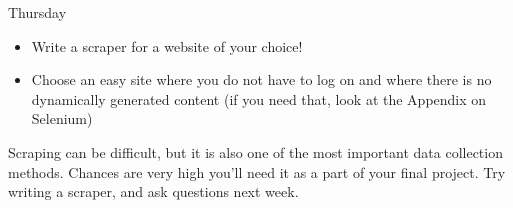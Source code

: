 \documentclass{beamer}
\begin{document}
%
%


\begin{frame}{Thursday}


\begin{itemize}
\item Write a scraper for a website of your choice!
\item Choose an easy site where you do not have to log on and where there is no dynamically generated content (if you need that, look at the Appendix on Selenium)
\end{itemize}

\pause

Scraping can be difficult, but it is also one of the most important data collection methods. Chances are very high you'll need it as a part of your final project. Try writing a scraper, and ask questions next week.

\end{frame}


\begin{frame}[plain]{}
\end{frame}
\end{document}

